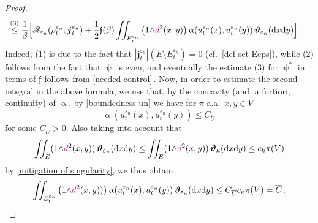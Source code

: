\documentclass[11pt,reqno]{amsart}
\numberwithin{equation}{section}
\newcommand{\R}{\mathbb{R}}
\newcommand{\eps}{\varepsilon}
\newcommand{\dd}{\mathrm{d}}
\theoremstyle{definition}
\newcommand{\ep}{\varepsilon}
\let\eps\ep
\def\dd{\mathrm{d}}
\newcommand{\teta}{\boldsymbol \vartheta}
\newcommand{\tetapi}{\boldsymbol{\teta}_{\kappa}}
\newcommand{\tetapien}{\boldsymbol{\teta}_{\eps_n}}
\newcommand{\bj}{{\boldsymbol j}}
\newcommand{\scrR}{\mathscr{R}}
\newcommand{\ej}{\eps_n}
\newcommand{\psih}{\mathfrak{f}}%
\newcommand{\RCR}{\color{magenta}}
\newcommand{\RNEW}{\color{black}} %
\newcommand{\EEE}{\color{black}}
\newcommand{\dpi}{{\color{magenta} d}}
\numberwithin{equation}{section}
\begin{document}
\begin{proof}
\begin{equation}
\begin{aligned}
  & 
    \stackrel{(3)}\leq  \frac1\beta 
       \Big[
\scrR_{\ej} (\rho_t^{\ej}, \bj_t^{\ej})
+ \RNEW \frac12 \EEE\psih(\beta) \iint_{E_t^{\ej}}   \left( 1{\wedge}\dpi^2(x,y) \right) \upalpha(u_t^{\ej}(x), u_t^{\ej}(y)) \,  \tetapien  (\dd x \dd y ) \Big]\,.
  \end{aligned}
  \end{equation}
 Indeed,
     {\footnotesize (1)} is due to the fact that $|\bj_t^{\ej}|(E {\setminus} E_t^{\ej}) = 0$ (cf.\ \eqref{def-set-Eeps}),  while 
     \RNEW
     {\footnotesize (2)} follows from the fact that $\uppsi$ is even, and eventually
      the estimate 
      {\footnotesize (3)} for $\uppsi^*$ in terms of $\psih$  follows from \eqref{needed-control}\,. \EEE
     Now, in order to estimate the second integral in the above formula, we use that, 
     \RCR by the concavity (and, a fortiori, continuity) of $\upalpha$,
     by \eqref{boundedness-un} we have for  $\pi$-a.a.\ $x,y\in V$
     \begin{equation}
     \label{for-later-use-uppalpha}
      \upalpha(u_t^{\ej}(x), u_t^{\ej}(y))\leq %
       C_{\overline{U}}\,
     \end{equation}
     for some $ C_{\overline{U}}>0$. \EEE
     Also taking into account that 
       \[
   \iint_{E}  ( 1{\wedge}\dpi^2(x,y))\, \tetapien(\dd x \dd y )  \leq   \iint_{E}  ( 1{\wedge}\dpi^2(x,y))\, \tetapi(\dd x \dd y )  \leq c_k \pi(V)
   \]
   by \eqref{mitigation of singularity}, we thus obtain 
      \begin{equation}
    \label{calc2}
     \begin{aligned}
      \iint_{E_t^{\ej}}   \left( 1{\wedge}\dpi^2(x,y)) \right) \upalpha(u_t^{\ej}(x), u_t^{\ej}(y)) \,  \tetapien  (\dd x \dd y ) \leq   C_{\overline{U}}  c_\kappa \pi(V)  \doteq \overline{C}\,.

\end{aligned}
\end{equation}
\end{proof}
\end{document}
